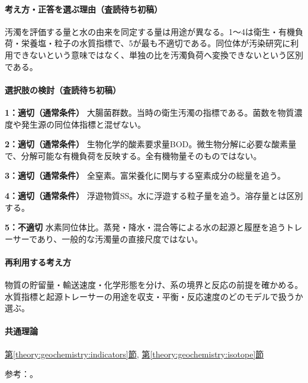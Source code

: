 \paragraph{考え方・正答を選ぶ理由（査読待ち初稿）} 汚濁を評価する量と水の由来を同定する量は用途が異なる。1〜4は衛生・有機負荷・栄養塩・粒子の水質指標で、5が最も不適切である。同位体が汚染研究に利用できないという意味ではなく、単独の比を汚濁負荷へ変換できないという区別である。

\paragraph{選択肢の検討（査読待ち初稿）}\mbox{}\par

\noindent\textbf{1：適切（通常条件）} 大腸菌群数。当時の衛生汚濁の指標である。菌数を物質濃度や発生源の同位体指標と混ぜない。\par

\noindent\textbf{2：適切（通常条件）} 生物化学的酸素要求量BOD。微生物分解に必要な酸素量で、分解可能な有機負荷を反映する。全有機物量そのものではない。\par

\noindent\textbf{3：適切（通常条件）} 全窒素。富栄養化に関与する窒素成分の総量を追う。\par

\noindent\textbf{4：適切（通常条件）} 浮遊物質SS。水に浮遊する粒子量を追う。溶存量とは区別する。\par

\noindent\textbf{5：不適切} 水素同位体比。蒸発・降水・混合等による水の起源と履歴を追うトレーサーであり、一般的な汚濁量の直接尺度ではない。\par

\paragraph{再利用する考え方} 物質の貯留量・輸送速度・化学形態を分け、系の境界と反応の前提を確かめる。水質指標と起源トレーサーの用途を収支・平衡・反応速度のどのモデルで扱うか選ぶ。

\paragraph{共通理論} \hyperref[theory:geochemistry:indicators]{第\ref*{theory:geochemistry:indicators}節}, \hyperref[theory:geochemistry:isotope]{第\ref*{theory:geochemistry:isotope}節}

\par 参考：\cite{gc_hem,gc_meteoric}。

